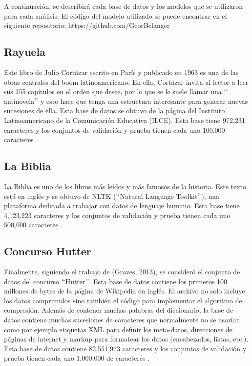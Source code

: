 A continuación, se describirá cada base de datos y los modelos que se utilizaron para cada análisis. El código del modelo utilizado se puede encontrar en el siguiente repositorio: https://github.com/GeorBelanger

\subsection{Rayuela}
Este libro de Julio Cortázar escrito en París y publicado en 1963 es una de las obras centrales del boom latinoamericano. En ella, Cortázar invita al lector a leer sus 155 capítulos en el orden que desee, por lo que se le suele llamar una $``$antinovela$"$ y esto hace que tenga una estructura interesante para generar nuevas sucesiones de ella.
Esta base de datos se obtuvo de la página del Instituto Latinoamericano de la Comunicación Educativa (ILCE). Esta base tiene 972,231 caracteres y los conjuntos de validación y prueba tienen cada uno 100,000 caracteres \cite{rayuela} \cite{cortazar}.


\subsection{La Biblia}
La Biblia es uno de los libros más leídos y más famosos de la historia. Este texto está en inglés y se obtuvo de NLTK ($``$Natural Language Toolkit$"$), una plataforma dedicada a trabajar con datos de lenguaje humano. Esta base tiene 4,123,223 caracteres y los conjuntos de validación y prueba tienen cada uno 500,000 caracteres \cite{nltk}.

\subsection{Concurso Hutter}
Finalmente, siguiendo el trabajo de (Graves, 2013), se consideró el conjunto de datos del concurso $``$Hutter$"$. Esta base de datos contiene los primeros 100 millones de bytes de la página de Wikipedia en inglés. El archivo no solo incluye los datos comprimidos sino también el código para implementar el algoritmo de compresión. Además de contener muchas palabras del diccionario, la base de datos contiene muchas sucesiones de caracteres que normalmente no se usarían como por ejemplo etiquetas XML para definir los meta-datos, direcciones de páginas de internet y markup para formatear los datos (encabezados, listas, etc.). Esta base de datos contiene 82,551,973 caracteres y los conjuntos de validación y prueba tienen cada uno 1,000,000 de caracteres \cite{DBLP:journals/corr/Graves13}.


